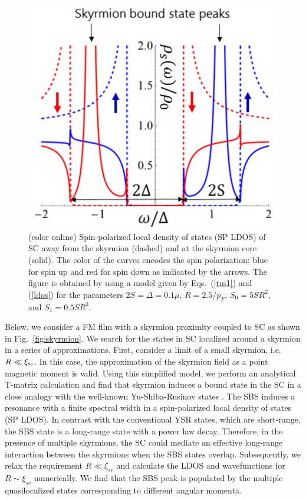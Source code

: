 \documentclass[twocolumn,showpacs,floatfix,longbibliography]{revtex4-1}
\begin{document}
\begin{figure} \centering
	\includegraphics[width=0.7\linewidth]{fig2}
	\caption{(color online) Spin-polarized local density of states (SP LDOS) of SC away from the skyrmion (dashed) and at the skyrmion core (solid). The color of the curves encodes the spin polarization: blue for spin up and red for spin down as indicated by the arrows. The figure is obtained by using a model given by Eqs.~(\ref{tm1}) and (\ref{ldos}) for the parameters $2S = \Delta = 0.1 \mu$, $R = 2.5/p_F$, $S_0 = 5SR^2$, and $S_1 = 0.5 SR^3$.} \label{fig:LDOS}
\end{figure}


Below, we consider a FM film with a skyrmion proximity coupled to SC as shown in Fig.~\ref{fig:skyrmion}. We search for the states in SC localized around a skyrmion in a series of approximations. First, consider a limit of a small skyrmion, i.e. $R\ll \xi_{\rm sc}$.  In this case, the approximation of the skyrmion field as a point magnetic moment is valid. Using this simplified model, we perform an analytical T-matrix calculation and find that skyrmion induces a bound state in the SC in a close analogy with the well-known Yu-Shiba-Rusinov states \cite{Yu,Shiba,Rusinov,Balatsky2006}. The SBS induces a resonance with a finite spectral width in a spin-polarized local density of states (SP LDOS). In contrast with the conventional YSR states, which are short-range, the SBS state is a long-range state with a power law decay. Therefore, in the presence of multiple skyrmions, the SC could mediate an effective long-range interaction between the skyrmions \cite{Yao2014,Shytov2009} when the SBS states overlap. Subsequently, we relax the requirement $R\ll \xi_{sc}$ and calculate the LDOS and wavefunctions for $R\sim \xi_{sc}$ numerically. We find that the SBS peak is populated by the multiple quasilocalized states corresponding to different angular momenta.
\end{document}
